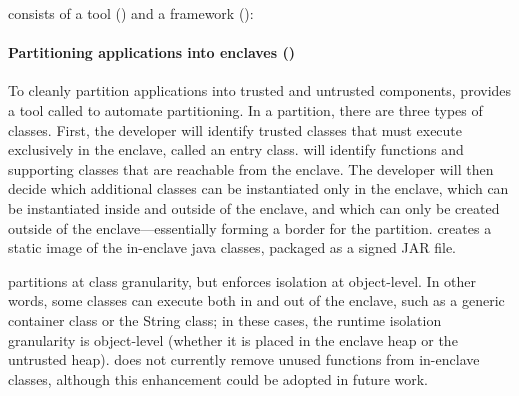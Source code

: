 
\sysname{} consists of a \staticphase{} tool (\statictool{}) and a \dynamicphase{} framework (\dynamicframework{}):

\paragraph{Partitioning \java{} applications into enclaves (\statictool{})}
To cleanly partition \java{} applications into
 trusted and untrusted components,
 \sysname{} provides a \staticphase{} tool called \statictool{}
 to automate partitioning.
 In a \sysname{} partition, there are three types of classes.
 First, the developer will identify trusted classes that must execute
 exclusively in the enclave, called an entry class.
 \statictool{}  will identify functions and supporting classes that are reachable
 from the enclave.
 The developer will then decide which additional classes can be instantiated
 only in the enclave, which can be instantiated inside and outside of the enclave, and
 which can only be created outside of the enclave---essentially forming a border
 for the partition.
 \statictool{} creates a static image of the in-enclave java classes, packaged as a signed JAR file.
 
 \sysname{} partitions at class granularity, but enforces isolation at  object-level.
 In other words, some classes can execute both in and out of the enclave,
 such as a generic container class or the String class; in these cases,
 the runtime isolation granularity is  object-level (whether it is placed
 in the enclave heap or the untrusted heap).
 \sysname{} does not currently remove unused functions from in-enclave classes,
 although this enhancement could be adopted in future work.
  



